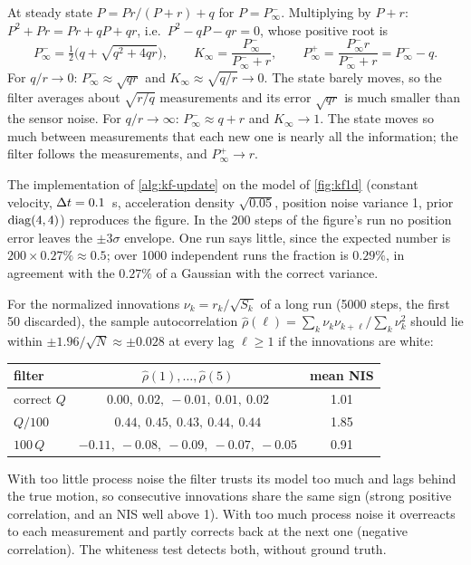 \begin{solutions}
  \item At steady state $P = Pr/(P + r) + q$ for $P = P^-_\infty$. Multiplying by $P + r$: $P^2 + Pr = Pr + qP + qr$, i.e.\ $P^2 - qP - qr = 0$, whose positive root is
        \[
          P^-_\infty = \tfrac12\big(q + \sqrt{q^2 + 4qr}\big), \qquad K_\infty = \frac{P^-_\infty}{P^-_\infty + r}, \qquad P^+_\infty = \frac{P^-_\infty r}{P^-_\infty + r} = P^-_\infty - q .
        \]
        For $q/r \to 0$: $P^-_\infty \approx \sqrt{qr}$ and $K_\infty \approx \sqrt{q/r} \to 0$. The state barely moves, so the filter averages about $\sqrt{r/q}$ measurements and
        its error $\sqrt{qr}$ is much smaller than the sensor noise. For $q/r \to \infty$: $P^-_\infty \approx q + r$ and $K_\infty \to 1$. The state moves so much between
        measurements that each new one is nearly all the information; the filter follows the measurements, and $P^+_\infty \to r$.

  \item The implementation of \cref{alg:kf-update} on the model of \cref{fig:kf1d} (constant velocity, ${\Delta t} = 0.1$~s, acceleration density $\sqrt{0.05}$,
        position noise variance 1, prior $\operatorname{diag}(4, 4)$) reproduces the figure. In the 200 steps of the figure's run no position error leaves the
        $\pm3\sigma$ envelope. One run says little, since the expected number is $200 \times 0.27\% \approx 0.5$; over 1000 independent runs the
        fraction is $0.29\%$, in agreement with the $0.27\%$ of a Gaussian with the correct variance.

  \item For the normalized innovations $\nu_k = r_k/\sqrt{S_k}$ of a long run (5000 steps, the first 50 discarded), the sample autocorrelation
        $\hat\rho(\ell) = \sum_k\nu_k\nu_{k+\ell}/\sum_k\nu_k^2$ should lie within $\pm1.96/\sqrt N \approx \pm0.028$ at every lag $\ell \ge 1$ if the innovations are white:
        \begin{center}\small
        \begin{tabular}{@{}l c c@{}}
        \toprule
        filter & $\hat\rho(1), \dots, \hat\rho(5)$ & mean NIS \\
        \midrule
        correct $Q$ & $0.00,\ 0.02,\ -0.01,\ 0.01,\ 0.02$ & 1.01 \\
        $Q/100$ & $0.44,\ 0.45,\ 0.43,\ 0.44,\ 0.44$ & 1.85 \\
        $100\,Q$ & $-0.11,\ -0.08,\ -0.09,\ -0.07,\ -0.05$ & 0.91 \\
        \bottomrule
        \end{tabular}
        \end{center}
        With too little process noise the filter trusts its model too much and lags behind the true motion, so consecutive innovations share the same
        sign (strong positive correlation, and an NIS well above 1). With too much process noise it overreacts to each measurement and partly
        corrects back at the next one (negative correlation). The whiteness test detects both, without ground truth.
\end{solutions}
